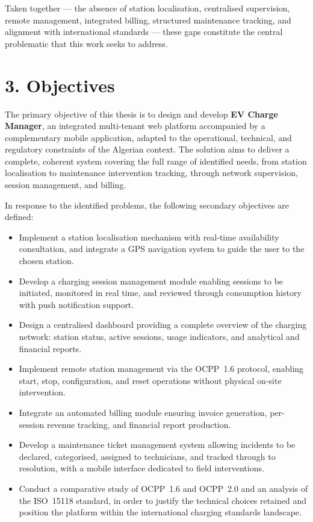\documentclass[12pt,a4paper]{report}
\begin{document}
Taken together --- the absence of station localisation, centralised supervision, remote
management, integrated billing, structured maintenance tracking, and alignment with
international standards --- these gaps constitute the central problematic that this work
seeks to address.

\section*{3. Objectives}

The primary objective of this thesis is to design and develop \textbf{EV Charge Manager},
an integrated multi-tenant web platform accompanied by a complementary mobile application,
adapted to the operational, technical, and regulatory constraints of the Algerian context.
The solution aims to deliver a complete, coherent system covering the full range of
identified needs, from station localisation to maintenance intervention tracking, through
network supervision, session management, and billing.

In response to the identified problems, the following secondary objectives are defined:

\begin{itemize}
  \item Implement a station localisation mechanism with real-time availability consultation,
        and integrate a GPS navigation system to guide the user to the chosen station.

  \item Develop a charging session management module enabling sessions to be initiated,
        monitored in real time, and reviewed through consumption history with push
        notification support.

  \item Design a centralised dashboard providing a complete overview of the charging
        network: station status, active sessions, usage indicators, and analytical and
        financial reports.

  \item Implement remote station management via the OCPP~1.6 protocol, enabling start,
        stop, configuration, and reset operations without physical on-site intervention.

  \item Integrate an automated billing module ensuring invoice generation, per-session
        revenue tracking, and financial report production.

  \item Develop a maintenance ticket management system allowing incidents to be declared,
        categorised, assigned to technicians, and tracked through to resolution, with a
        mobile interface dedicated to field interventions.

  \item Conduct a comparative study of OCPP~1.6 and OCPP~2.0 and an analysis of the
        ISO~15118 standard, in order to justify the technical choices retained and position
        the platform within the international charging standards landscape.
\end{itemize}
\end{document}
